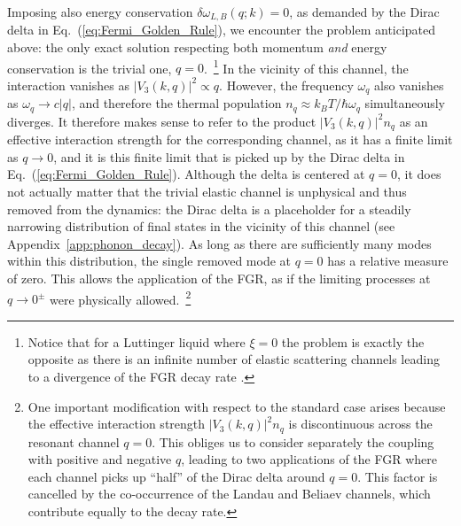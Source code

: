 \documentclass[aps,prd,notitlepage,amsfonts,amssymb,amsmath,nofootinbib,superscriptaddress,longbibliography]{revtex4-2}
\begin{document}
Imposing also energy conservation $\delta\omega_{L , B} \left( q;k \right) = 0$, as demanded by the Dirac delta in Eq.~(\ref{eq:Fermi_Golden_Rule}), we encounter the problem anticipated above: the only exact solution respecting both momentum {\it and} energy conservation is the trivial one, $q=0$.~\footnote{Notice that for a Luttinger liquid where $\xi =0$ the problem is exactly the opposite as there is an infinite number of elastic scattering channels leading to a divergence of the FGR decay rate \cite{andreev_hydrodynamics_1980,samokhin_lifetime_1998}.}
In the vicinity of this channel, the interaction vanishes as $\left|V_{3}(k,q)\right|^{2} \propto q$. However, the frequency $\omega_{q}$ also vanishes as $\omega_{q} \to c \left|q\right|$, and therefore the thermal population $n_{q} \approx k_{B}T/\hbar \omega_{q}$ simultaneously diverges. It therefore makes sense to refer to the product $\left| V_{3}(k,q) \right|^2 n_{q} $ as an effective interaction strength for the corresponding channel, as it has a finite limit as $q \to 0$, and it is this finite limit that is picked up by the Dirac delta in Eq.~(\ref{eq:Fermi_Golden_Rule}). Although the delta is centered at $q=0$, it does not actually matter that the trivial elastic channel is unphysical and thus removed from the dynamics: the Dirac delta is a placeholder for a steadily narrowing distribution of final states in the vicinity of this channel (see Appendix~\ref{app:phonon_decay}). As long as there are sufficiently many modes within this distribution, the single removed mode at $q=0$ has a relative measure of zero.  This allows the application of the FGR, as if the limiting processes at $q \to 0^{\pm}$ were physically allowed.~\footnote{One important modification with respect to the standard case arises because the effective interaction strength $\left|V_{3}(k,q)\right|^{2} n_{q}$ is discontinuous across the resonant channel $q=0$. This obliges us to consider separately the coupling with positive and negative $q$, leading to two applications of the FGR where each channel picks up ``half'' of the Dirac delta around $q=0$.
This factor is cancelled by the co-occurrence of the Landau and Beliaev channels, which contribute equally to the decay rate.}
\end{document}
